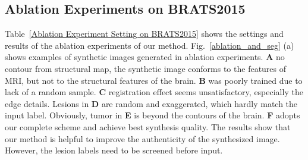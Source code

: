 \documentclass[runningheads]{llncs}
\begin{document}
	\subsection{Ablation Experiments on BRATS2015}
	Table~\ref{Ablation Experiment Setting on BRATS2015} shows the settings and results of the ablation experiments of our method.
	Fig.~\ref{ablation_and_seg} (a) shows examples of synthetic images generated in ablation experiments. 
	\textbf{A} no contour from structural map, the synthetic image conforms to the features of MRI, but not to the structural features of the brain. 
	\textbf{B} was poorly trained due to lack of a random sample.
	\textbf{C} registration effect seems unsatisfactory, especially the edge details.
	Lesions in \textbf{D} are random and exaggerated, which hardly match the input label. 
	Obviously, tumor in \textbf{E} is beyond the contours of the brain. 
	\textbf{F} adopts our complete scheme and achieve best synthesis quality. The results show that our method is helpful to improve the authenticity of the synthesized image. However, the lesion labels need to be screened before input.
	
\end{document}
